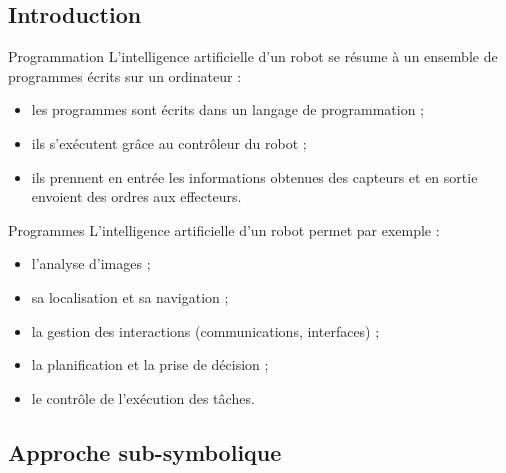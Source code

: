 \documentclass[compress]{beamer}
\begin{document}
\begin{frame}
\end{frame}

\subsection{Introduction}
\begin{frame}{Programmation}
L'intelligence artificielle d'un robot se résume à un ensemble de programmes écrits sur un ordinateur :
\begin{itemize}
\item les programmes sont écrits dans un langage de programmation ;
\item ils s'exécutent grâce au contrôleur du robot ;
\item ils prennent en entrée les informations obtenues des capteurs et en sortie envoient des ordres aux effecteurs.
\end{itemize}
\end{frame}

\begin{frame}{Programmes}
L'intelligence artificielle d'un robot permet par exemple :
\begin{itemize}
\item l'analyse d'images ;
\item sa localisation et sa navigation ;
\item la gestion des interactions (communications, interfaces) ;
 \item la planification et la prise de décision ;
\item le contrôle de l'exécution des tâches.
\end{itemize}
\end{frame}

\subsection{Approche sub-symbolique}
\end{document}
